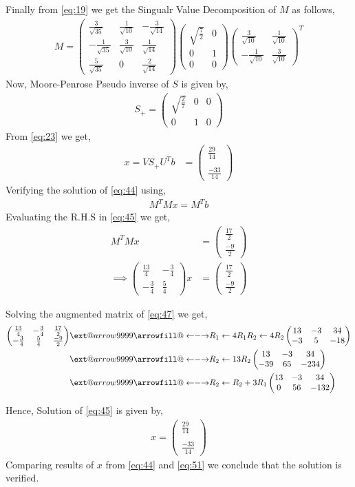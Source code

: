 \documentclass[journal,12pt,twocolumn]{IEEEtran}
\makeatletter
\newcommand\xleftrightarrow[2][]{%
  \ext@arrow 9999{\longleftrightarrowfill@}{#1}{#2}}
\newcommand\longleftrightarrowfill@{%
  \arrowfill@\leftarrow\relbar\rightarrow}
\newcommand{\myvec}[1]{\ensuremath{\begin{pmatrix}#1\end{pmatrix}}}
\makeatother
\begin{document}
Finally from \eqref{eq:19} we get the Singualr Value Decomposition of $M$ as follows,
\begin{align}
M =  \myvec{ \frac{3}{\sqrt{35}} & \frac{1}{\sqrt{10}}  &  -\frac{3}{\sqrt{14}}  \\  - \frac{1}{\sqrt{35}} & \frac{3}{\sqrt{10}}  &  \frac{1}{\sqrt{14}} \\ \frac{5}{\sqrt{35}} & 0  &  \frac{2}{\sqrt{14}} }\myvec{\sqrt{\frac{7}{2}}&0\\0&1\\0&0}\myvec{\frac{3}{\sqrt{10}}&\frac{1}{\sqrt{10}}\\ -\frac{1}{\sqrt{10}}&\frac{3}{\sqrt{10}}}^T
\end{align}
Now, Moore-Penrose Pseudo inverse of $S$ is given by,
\begin{align}
S_+ = \myvec{\sqrt{\frac{2}{7}}&0&0\\0&1&0}
\end{align}
From \eqref{eq:23} we get,
\begin{align}
x = VS_+U^Tb &= \myvec{\frac{29}{14}\\\\\frac{-33}{14}}\label{eq:44}
\end{align}
Verifying the solution of \eqref{eq:44} using,
\begin{align}
M^TMx = M^Tb\label{eq:45}
\end{align}
Evaluating the R.H.S in \eqref{eq:45} we get,
\begin{align}
M^TMx &= \myvec{\frac{17}{2}\\\frac{-9}{2}}\\
\implies\myvec{\frac{13}{4}& -\frac{3}{4}\\ -\frac{3}{4}&\frac{5}{4}}x &= \myvec{\frac{17}{2}\\\frac{-9}{2}}\label{eq:47}
\end{align}



Solving the augmented matrix of \eqref{eq:47} we get,
\begin{align}
\myvec{\frac{13}{4}&-\frac{3}{4}& \frac{17}{2} \\-\frac{3}{4}&\frac{5}{4}& \frac{-9}{2}} &\xleftrightarrow[R_1\leftarrow 4R_1]{R_2\leftarrow 4R_2}\myvec{13 & -3 & 34\\ -3 & 5 & -18}\\
&\xleftrightarrow{R_2\leftarrow 13R_2}\myvec{13 & -3 & 34 \\ -39 & 65 & -234}\\
&\xleftrightarrow{R_2 \leftarrow R_2+3R_1}\myvec{13 & -3 & 34 \\ 0 & 56 & -132}
\end{align}

Hence, Solution of \eqref{eq:45} is given by,
\begin{align}
x=\myvec{\frac{29}{14}\\\\\frac{-33}{14}}\label{eq:51}
\end{align}
Comparing results of $x$ from \eqref{eq:44} and \eqref{eq:51} we conclude that the solution is verified.
\end{document}
